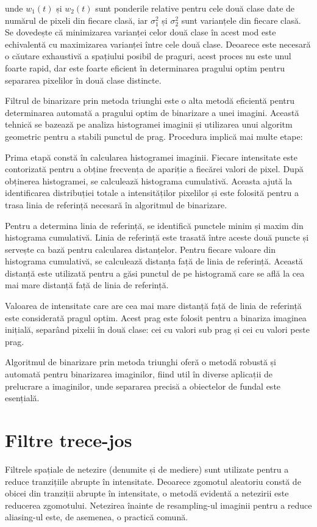 \documentclass[a4paper,12pt]{report}
\begin{document}
unde \( w_1(t) \) și \( w_2(t) \) sunt ponderile relative pentru cele două clase date de numărul de pixeli din fiecare clasă, iar \( \sigma_1^2 \) și \( \sigma_2^2 \) sunt varianțele din fiecare clasă. Se dovedește că minimizarea varianței celor două clase în acest mod este echivalentă cu maximizarea varianței între cele două clase. Deoarece este necesară o căutare exhaustivă a spațiului posibil de praguri, acest proces nu este unul foarte rapid, dar este foarte eficient în determinarea pragului optim pentru separarea pixelilor în două clase distincte.

Filtrul de binarizare prin metoda triunghi este o alta metodă eficientă pentru determinarea automată a pragului optim de binarizare a unei imagini. Această tehnică se bazează pe analiza histogramei imaginii și utilizarea unui algoritm geometric pentru a stabili punctul de prag. Procedura implică mai multe etape:

Prima etapă constă în calcularea histogramei imaginii. Fiecare intensitate este contorizată pentru a obține frecvența de apariție a fiecărei valori de pixel. După obținerea histogramei, se calculează histograma cumulativă. Aceasta ajută la identificarea distribuției totale a intensităților pixelilor și este folosită pentru a trasa linia de referință necesară în algoritmul de binarizare.

Pentru a determina linia de referință, se identifică punctele minim și maxim din histograma cumulativă. Linia de referință este trasată între aceste două puncte și servește ca bază pentru calcularea distanțelor. Pentru fiecare valoare din histograma cumulativă, se calculează distanța față de linia de referință. Această distanță este utilizată pentru a găsi punctul de pe histogramă care se află la cea mai mare distanță față de linia de referință.

Valoarea de intensitate care are cea mai mare distanță față de linia de referință este considerată pragul optim. Acest prag este folosit pentru a binariza imaginea inițială, separând pixelii în două clase: cei cu valori sub prag și cei cu valori peste prag.

Algoritmul de binarizare prin metoda triunghi oferă o metodă robustă și automată pentru binarizarea imaginilor, fiind util în diverse aplicații de prelucrare a imaginilor, unde separarea precisă a obiectelor de fundal este esențială.

\section{Filtre trece-jos}
Filtrele spațiale de netezire (denumite și de mediere) sunt utilizate pentru a reduce tranzițiile abrupte în intensitate. Deoarece zgomotul aleatoriu constă de obicei din tranziții abrupte în intensitate, o metodă evidentă a netezirii este reducerea zgomotului. Netezirea înainte de resampling-ul imaginii pentru a reduce aliasing-ul este, de asemenea, o practică comună.
\end{document}
